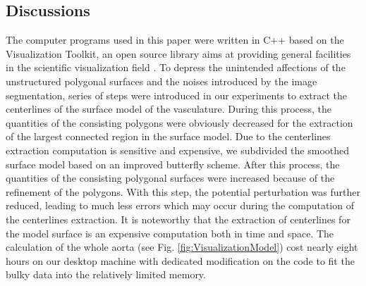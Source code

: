 \subsection{Discussions}

The computer programs used in this paper were written in C++ based on the Visualization Toolkit, an open source library aims at providing general facilities in the scientific visualization field \cite{Schroeder2000VTK}. %
To depress the unintended affections of the unstructured polygonal surfaces and the noises introduced by the image segmentation, series of steps were introduced in our experiments to extract the centerlines of the surface model of the vasculature. %
During this process, the quantities of the consisting polygons were obviously decreased for the extraction of the largest connected region in the surface model.
Due to the centerlines extraction computation is sensitive and expensive, we subdivided the smoothed surface model based on an improved butterfly scheme.
After this process, the quantities of the consisting polygonal surfaces were increased because of the refinement of the polygons.
With this step, the potential perturbation was further reduced, leading to much less errors which may occur during the computation of the centerlines extraction.
It is noteworthy that the extraction of centerlines for the model surface is an expensive computation both in time and space.
The calculation of the whole aorta (see Fig. \ref{fig:VisualizationModel}) cost nearly eight hours on our desktop machine with dedicated modification on the code to fit the bulky data into the relatively limited memory. %
